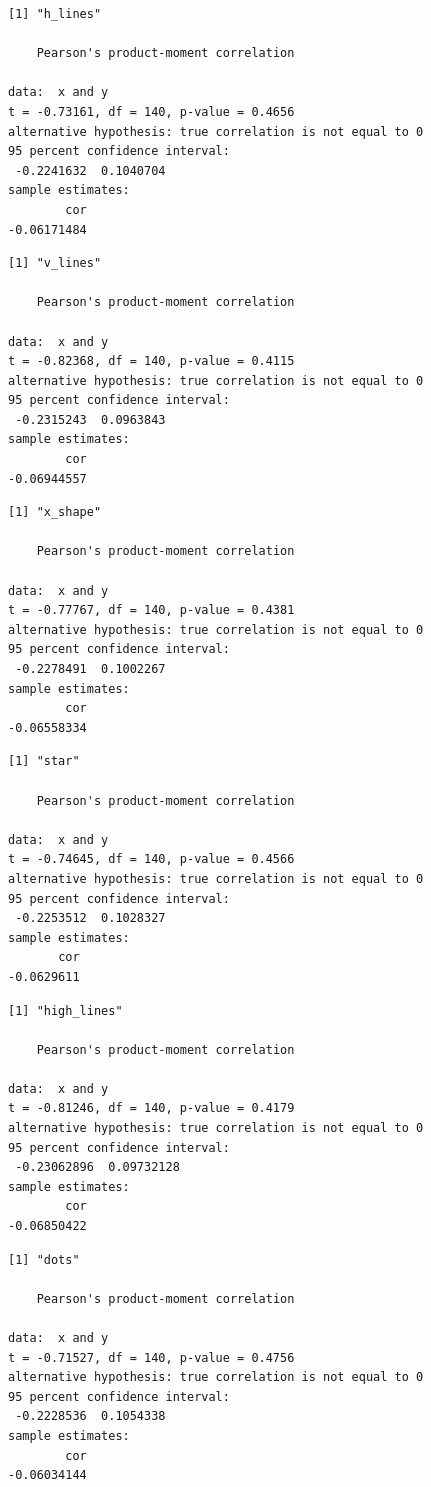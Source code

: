 \documentclass[
  oneside]{krantz}
\begin{document}
\begin{verbatim}
[1] "h_lines"

    Pearson's product-moment correlation

data:  x and y
t = -0.73161, df = 140, p-value = 0.4656
alternative hypothesis: true correlation is not equal to 0
95 percent confidence interval:
 -0.2241632  0.1040704
sample estimates:
        cor 
-0.06171484 
\end{verbatim}

\begin{verbatim}
[1] "v_lines"

    Pearson's product-moment correlation

data:  x and y
t = -0.82368, df = 140, p-value = 0.4115
alternative hypothesis: true correlation is not equal to 0
95 percent confidence interval:
 -0.2315243  0.0963843
sample estimates:
        cor 
-0.06944557 
\end{verbatim}

\begin{verbatim}
[1] "x_shape"

    Pearson's product-moment correlation

data:  x and y
t = -0.77767, df = 140, p-value = 0.4381
alternative hypothesis: true correlation is not equal to 0
95 percent confidence interval:
 -0.2278491  0.1002267
sample estimates:
        cor 
-0.06558334 
\end{verbatim}

\begin{verbatim}
[1] "star"

    Pearson's product-moment correlation

data:  x and y
t = -0.74645, df = 140, p-value = 0.4566
alternative hypothesis: true correlation is not equal to 0
95 percent confidence interval:
 -0.2253512  0.1028327
sample estimates:
       cor 
-0.0629611 
\end{verbatim}

\begin{verbatim}
[1] "high_lines"

    Pearson's product-moment correlation

data:  x and y
t = -0.81246, df = 140, p-value = 0.4179
alternative hypothesis: true correlation is not equal to 0
95 percent confidence interval:
 -0.23062896  0.09732128
sample estimates:
        cor 
-0.06850422 
\end{verbatim}

\begin{verbatim}
[1] "dots"

    Pearson's product-moment correlation

data:  x and y
t = -0.71527, df = 140, p-value = 0.4756
alternative hypothesis: true correlation is not equal to 0
95 percent confidence interval:
 -0.2228536  0.1054338
sample estimates:
        cor 
-0.06034144 
\end{verbatim}
\end{document}
